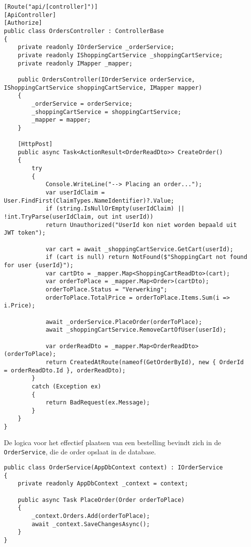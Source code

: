 \begin{lstlisting}[style=mystyleA, caption=OrdersController.cs (fragment), label=lst:MonoOrdersController]
[Route("api/[controller]")]
[ApiController]
[Authorize]
public class OrdersController : ControllerBase
{
	private readonly IOrderService _orderService;
	private readonly IShoppingCartService _shoppingCartService;
	private readonly IMapper _mapper;
	
	public OrdersController(IOrderService orderService, IShoppingCartService shoppingCartService, IMapper mapper)
	{
		_orderService = orderService;
		_shoppingCartService = shoppingCartService;
		_mapper = mapper;
	}
	
	[HttpPost]
	public async Task<ActionResult<OrderReadDto>> CreateOrder()
	{
		try
		{
			Console.WriteLine("--> Placing an order...");
			var userIdClaim = User.FindFirst(ClaimTypes.NameIdentifier)?.Value;
			if (string.IsNullOrEmpty(userIdClaim) || !int.TryParse(userIdClaim, out int userId))
			return Unauthorized("UserId kon niet worden bepaald uit JWT token");
			
			var cart = await _shoppingCartService.GetCart(userId);
			if (cart is null) return NotFound($"ShoppingCart not found for user {userId}");
			var cartDto = _mapper.Map<ShoppingCartReadDto>(cart);
			var orderToPlace = _mapper.Map<Order>(cartDto);
			orderToPlace.Status = "Verwerking";
			orderToPlace.TotalPrice = orderToPlace.Items.Sum(i => i.Price);
			
			await _orderService.PlaceOrder(orderToPlace);
			await _shoppingCartService.RemoveCartOfUser(userId);
			
			var orderReadDto = _mapper.Map<OrderReadDto>(orderToPlace);
			return CreatedAtRoute(nameof(GetOrderById), new { OrderId = orderReadDto.Id }, orderReadDto);
		}
		catch (Exception ex)
		{
			return BadRequest(ex.Message);
		}
	}
}
\end{lstlisting}

\medskip
De logica voor het effectief plaatsen van een bestelling bevindt zich in de \texttt{OrderService}, die de order opslaat in de database.
\medskip

\begin{lstlisting}[style=mystyleA, caption=OrderService.cs (fragment), label=lst:MonoOrderService]
public class OrderService(AppDbContext context) : IOrderService
{
	private readonly AppDbContext _context = context;
	
	public async Task PlaceOrder(Order orderToPlace)
	{
		_context.Orders.Add(orderToPlace);
		await _context.SaveChangesAsync();
	}
}
\end{lstlisting}


